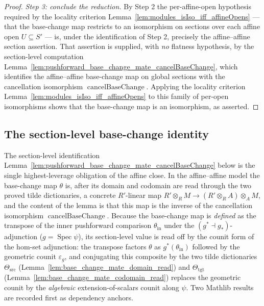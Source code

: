 \begin{proof}
  \medskip
  \emph{Step 3: conclude the reduction.} By Step 2 the per-affine-open hypothesis
  required by the locality criterion Lemma~\ref{lem:modules_isIso_iff_affineOpens} —
  that the base-change map restricts to an isomorphism on sections over each affine
  open \(U \subseteq S'\) — is, under the identification of Step 2, precisely the
  affine--affine section assertion. That assertion is supplied, with \emph{no} flatness
  hypothesis, by the section-level computation
  Lemma~\ref{lem:pushforward_base_change_mate_cancelBaseChange}, which identifies the
  affine--affine base-change map on global sections with the cancellation isomorphism
  \(\operatorname{cancelBaseChange}\). Applying the locality criterion
  Lemma~\ref{lem:modules_isIso_iff_affineOpens} to this family of per-open
  isomorphisms shows that the base-change map is an isomorphism, as asserted.
\end{proof}

\subsection{The section-level base-change identity}

The section-level identification
Lemma~\ref{lem:pushforward_base_change_mate_cancelBaseChange} below is the single
highest-leverage obligation of the affine close. In the affine--affine model the
base-change map \(\theta\) is, after its domain and codomain are read through the two
proved tilde dictionaries, a concrete \(R'\)-linear map
\(R' \otimes_R M \to (R' \otimes_R A) \otimes_A M\), and the content of the lemma is
that this map is the inverse of the cancellation isomorphism
\(\operatorname{cancelBaseChange}\). Because the base-change map is \emph{defined} as the
transpose of the inner pushforward comparison \(\theta_{\mathrm{in}}\) under the
\((g^* \dashv g_*)\)-adjunction (\(g = \operatorname{Spec}\psi\)), its section-level value
is read off by the counit form of the hom-set adjunction: the transpose
factors \(\theta\) as \(g^*(\theta_{\mathrm{in}})\) followed by the geometric counit
\(\varepsilon_g\), and conjugating this composite by the two tilde dictionaries
\(\Theta_{\mathrm{src}}\) (Lemma~\ref{lem:base_change_mate_domain_read}) and
\(\Theta_{\mathrm{tgt}}\) (Lemma~\ref{lem:base_change_mate_codomain_read}) replaces the
geometric counit by the \emph{algebraic} extension-of-scalars counit along \(\psi\). Two Mathlib results are recorded
first as dependency anchors.

